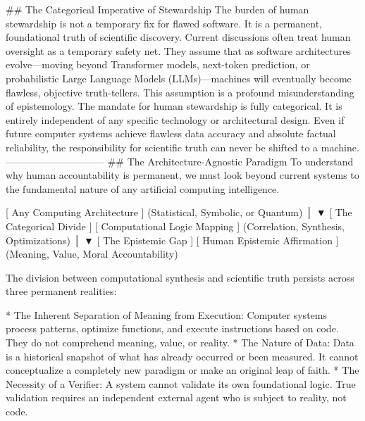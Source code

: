 ## The Categorical Imperative of Stewardship
The burden of human stewardship is not a temporary fix for flawed software. It is a permanent, foundational truth of scientific discovery.
Current discussions often treat human oversight as a temporary safety net. They assume that as software architectures evolve—moving beyond Transformer models, next-token prediction, or probabilistic Large Language Models (LLMs)—machines will eventually become flawless, objective truth-tellers. This assumption is a profound misunderstanding of epistemology.
The mandate for human stewardship is fully categorical. It is entirely independent of any specific technology or architectural design. Even if future computer systems achieve flawless data accuracy and absolute factual reliability, the responsibility for scientific truth can never be shifted to a machine.
------------------------------
## The Architecture-Agnostic Paradigm
To understand why human accountability is permanent, we must look beyond current systems to the fundamental nature of any artificial computing intelligence.

       [ Any Computing Architecture ]
     (Statistical, Symbolic, or Quantum)
                     │
                     ▼  [ The Categorical Divide ]
       [ Computational Logic Mapping ]
     (Correlation, Synthesis, Optimizations)
                     │
                     ▼  [ The Epistemic Gap ]
       [ Human Epistemic Affirmation ]
     (Meaning, Value, Moral Accountability)

The division between computational synthesis and scientific truth persists across three permanent realities:

* The Inherent Separation of Meaning from Execution: Computer systems process patterns, optimize functions, and execute instructions based on code. They do not comprehend meaning, value, or reality.
* The Nature of Data: Data is a historical snapshot of what has already occurred or been measured. It cannot conceptualize a completely new paradigm or make an original leap of faith.
* The Necessity of a Verifier: A system cannot validate its own foundational logic. True validation requires an independent external agent who is subject to reality, not code.

